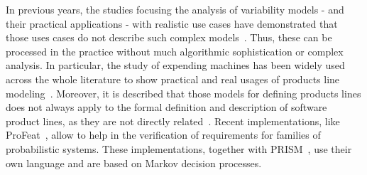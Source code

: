 In previous years, the studies focusing the analysis of variability models  - and
their practical applications - with realistic use cases 
have demonstrated that those uses cases do not describe such complex models~\cite{jhf11, jhfes12}. Thus, these
can be processed in the practice without much algorithmic sophistication or
complex analysis.
In particular, the study of expending machines
has been widely used across the whole
literature to show practical and real usages of products
line modeling~\cite{jhfes12}. Moreover, it is described that those models for defining products
lines does not always apply to the
formal definition and description of software
product lines, as they are not directly related~\cite{cds06, fub06, nnz14}.
Recent implementations, like ProFeat~\cite{Chrszon2018}, allow to 
help in the verification of requirements for families of probabilistic systems. These implementations,  
together with PRISM~\cite{mgd12}, use their own language and are based on Markov decision processes.


